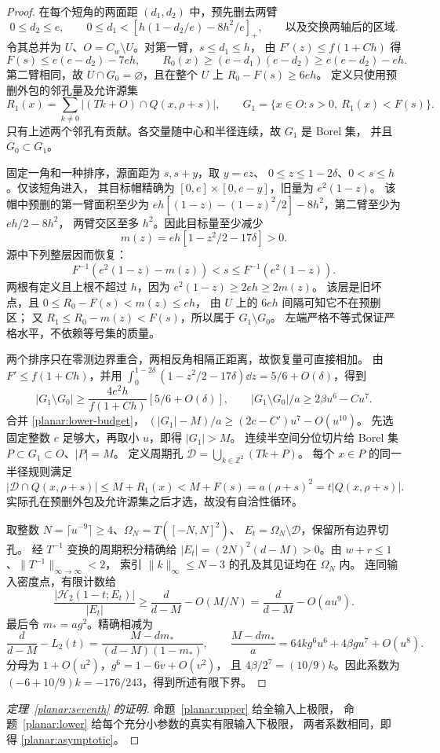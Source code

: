 \begin{proof}
在每个短角的两面距 \((d_1,d_2)\) 中，预先删去两臂
\begin{equation}\label{planar:predeleted-arms}
 0\le d_2\le e,\qquad
 0\le d_1<[h(1-d_2/e)-8h^2/e]_+,
 \qquad\text{以及交换两轴后的区域}.
\end{equation}
令其总并为 \(U\)、\(O=C_w\setminus U\)。对第一臂，\(s\le d_1\le h\)，
由 \(F'(z)\le f(1+Ch)\) 得
\[
 F(s)\le e(e-d_2)-7eh,\qquad
 R_0(x)\ge(e-d_1)(e-d_2)\ge e(e-d_2)-eh.
\]
第二臂相同，故 \(U\cap G_0=\varnothing\)，且在整个 \(U\) 上
\(R_0-F(s)\ge6eh\)。
定义只使用预删外包的邻孔量及允许源集
\[
 R_1(x)=\sum_{k\ne0}|(Tk+O)\cap Q(x,\rho+s)|,\qquad
 G_1=\{x\in O:s>0,\ R_1(x)<F(s)\}.
\]
只有上述两个邻孔有贡献。各交量随中心和半径连续，故 \(G_1\) 是 Borel 集，
并且 \(G_0\subset G_1\)。

固定一角和一种排序，源面距为 \(s,s+y\)，取 \(y=ez\)、
\(0\le z\le1-2\delta\)、\(0<s\le h\)。仅该短角进入，
其目标帽精确为 \([0,e]\times[0,e-y]\)，旧量为 \(e^2(1-z)\)。
该帽中预删的第一臂面积至少为
\(eh[(1-z)-(1-z)^2/2]-8h^2\)，第二臂至少为 \(eh/2-8h^2\)，
两臂交区至多 \(h^2\)。因此目标量至少减少
\[
 m(z)=eh[1-z^2/2-17\delta]>0.
\]
源中下列整层因而恢复：
\begin{equation}\label{planar:restored-layer}
 F^{-1}(e^2(1-z)-m(z))<s\le F^{-1}(e^2(1-z)).
\end{equation}
两根有定义且上根不超过 \(h\)，因为 \(e^2(1-z)\ge2eh\ge2m(z)\)。
该层是旧坏点，且 \(0\le R_0-F(s)<m(z)\le eh\)，
由 \(U\) 上的 \(6eh\) 间隔可知它不在预删区；
又 \(R_1\le R_0-m(z)<F(s)\)，所以属于 \(G_1\setminus G_0\)。
左端严格不等式保证严格水平，不依赖等号集的质量。

两个排序只在零测边界重合，两相反角相隔正距离，故恢复量可直接相加。
由 \(F'\le f(1+Ch)\)，并用
\(\int_0^{1-2\delta}(1-z^2/2-17\delta)\dd z=5/6+O(\delta)\)，得到
\[
 |G_1\setminus G_0|
 \ge\frac{4e^2h}{f(1+Ch)}[5/6+O(\delta)],\qquad
 |G_1\setminus G_0|/a\ge2\beta u^6-Cu^7.
\]
合并 \eqref{planar:lower-budget}，
\((|G_1|-M)/a\ge(2c-C')u^7-O(u^{10})\)。
先选固定整数 \(c\) 足够大，再取小 \(u\)，即得 \(|G_1|>M\)。
连续半空间分位切片给 Borel 集 \(P\subset G_1\subset O\)、\(|P|=M\)。
定义周期孔 \(\mathscr D=\bigcup_{k\in\mathbb Z^2}(Tk+P)\)。
每个 \(x\in P\) 的同一半径规则满足
\[
 |\mathscr D\cap Q(x,\rho+s)|\le M+R_1(x)
 <M+F(s)=a(\rho+s)^2=t|Q(x,\rho+s)|.
\]
实际孔在预删外包及允许源集之后才选，故没有自洽性循环。

取整数 \(N=\lceil u^{-9}\rceil\ge4\)、\(\Omega_N=T([-N,N]^2)\)、
\(E_t=\Omega_N\setminus\mathscr D\)，保留所有边界切孔。
经 \(T^{-1}\) 变换的周期积分精确给
\(|E_t|=(2N)^2(d-M)>0\)。由 \(w+r\le1\)、\(\|T^{-1}\|_{\infty\to\infty}<2\)，
索引 \(\|k\|_\infty\le N-3\) 的孔及其见证均在 \(\Omega_N\) 内。
连同输入密度点，有限计数给
\[
 \frac{|\mathcal H_2(1-t;E_t)|}{|E_t|}
 \ge\frac d{d-M}-O(M/N)=\frac d{d-M}-O(au^9).
\]
最后令 \(m_*=ag^2\)。精确相减为
\[
 \frac d{d-M}-L_2(t)=\frac{M-dm_*}{(d-M)(1-m_*)},\qquad
 \frac{M-dm_*}{a}=64k g^6u^6+4\beta g u^7+O(u^8).
\]
分母为 \(1+O(u^2)\)，\(g^6=1-6v+O(v^2)\)，
且 \(4\beta/2^7=(10/9)k\)。因此系数为
\((-6+10/9)k=-176/243\)，得到所述有限下界。
\end{proof}

\begin{proof}[定理~\ref{planar:seventh} 的证明]
命题~\ref{planar:upper} 给全输入上极限，
命题~\ref{planar:lower} 给每个充分小参数的真实有限输入下极限，
两者系数相同，即得 \eqref{planar:asymptotic}。
\end{proof}
